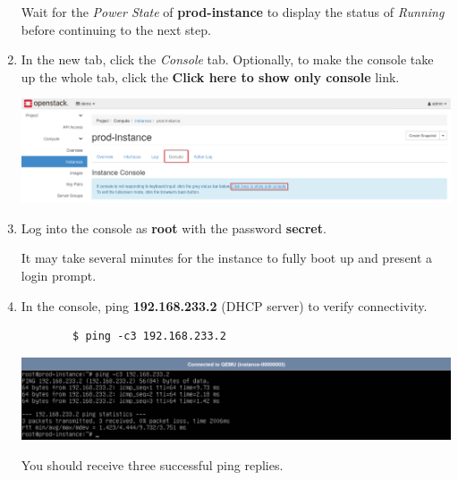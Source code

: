 \documentclass[letterpaper, 12pt]{article}
\begin{document}
\begin{enumerate}
    \begin{stopbox}
        Wait for the \textit{Power State} of \textbf{prod-instance} to display the status of \textit{Running} before
        continuing to the next step.
    \end{stopbox}

    \item In the new tab, click the \textit{Console} tab. Optionally, to make the console take up the whole tab, click
    the \textbf{Click here to show only console} link.
    
    \begin{center}
        \includegraphics[width=\linewidth]{images/part1/step11.png}
    \end{center}

    \item Log into the console as \textbf{root} with the password \textbf{secret}.
    
    \begin{notebox}
        It may take several minutes for the instance to fully boot up and present a login prompt.
    \end{notebox}

    \item In the console, ping \textbf{192.168.233.2} (DHCP server) to verify connectivity.
    \begin{lstlisting}
        $ ping -c3 192.168.233.2
    \end{lstlisting}

    \begin{center}
        \includegraphics[width=\linewidth]{images/part1/step13.png}
    \end{center}

    \begin{notebox}
        You should receive three successful ping replies.
    \end{notebox}


\end{enumerate}
\end{document}
